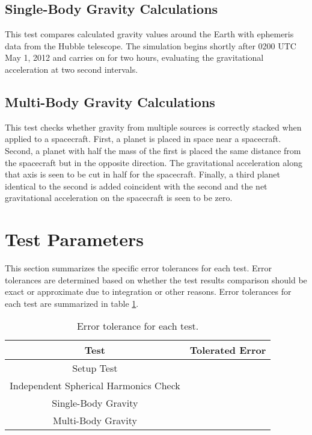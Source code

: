 \subsection{Single-Body Gravity Calculations} This test compares calculated gravity values around the Earth with ephemeris data from the Hubble telescope. The simulation begins shortly after 0200 UTC May 1, 2012 and carries on for two hours, evaluating the gravitational acceleration at two  second intervals.
\subsection{Multi-Body Gravity Calculations} This test checks whether gravity from multiple sources is correctly stacked when applied to a spacecraft. First, a planet is placed in space near a spacecraft. Second, a planet with half the mass of the first is placed the same distance from the spacecraft but in the opposite direction. The gravitational acceleration along that axis is seen to be cut in half for the spacecraft. Finally, a third planet identical to the second is added coincident with the second and the net gravitational acceleration on the spacecraft is seen to be zero. 

\section{Test Parameters}

This section summarizes the  specific error tolerances for each test. Error tolerances are determined based on whether the test results comparison should be exact or approximate due to integration or other reasons. Error tolerances for each test are summarized in table \ref{tab:errortol}. \\

\begin{table}[htbp]
	\caption{Error tolerance for each test.}
	\label{tab:errortol}
	\centering \fontsize{10}{10}\selectfont
	\begin{tabular}{ c | c } %
		\hline
		\textbf{Test}   							    & \textbf{Tolerated Error} 						  \\ \hline
		Setup Test                           			 & 		   \\ 
		Independent Spherical Harmonics Check  & 		   \\ 
		Single-Body Gravity						   & 														   \\ 
		Multi-Body Gravity 						   & 	 		       \\ \hline
	\end{tabular}
\end{table}


